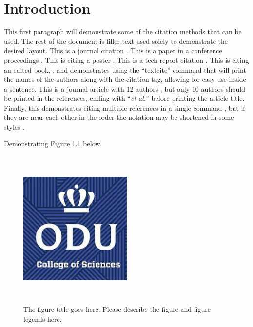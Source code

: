 \chapter{Introduction} 
This first paragraph will demonstrate some of the citation methods that can be used. The rest of the document is filler text used solely to demonstrate the desired layout.  This is a journal citation \autocite{berlin-tweb23}. This is a paper in a conference proceedings \autocite{weigle-jcdl23}. This is citing a poster \autocite{jayanetti-sbp23}. This is a tech report citation \autocite{weigle-2023}. This is citing an edited book, \textcite{vanet-book}, and demonstrates using the ``textcite'' command that will print the names of the authors along with the citation tag, allowing for easy use inside a sentence.  This is a journal article with 12 authors \autocite{coifman2005geometric}, but only 10 authors should be printed in the references, ending with ``\emph{et al.}'' before printing the article title.  Finally, this  demonstrates citing multiple references in a single command \autocites{jones-memento21,vanet-book,weigle-jcdl23}, but if they are near each other in the order the notation may be shortened in some styles \autocites{berlin-tweb23, weigle-jcdl23, jayanetti-sbp23}.

Demonstrating Figure \ref{fig:cos1} below.
\begin{figure}[tbh]
  \centering
  \includegraphics[height=8cm, width=0.5\textwidth]{Figures/cos1.jpeg}
  \caption[The figure title goes here.]{The figure title goes here. Please describe the figure and figure legends here.}
  \label{fig:cos1}
\end{figure}

